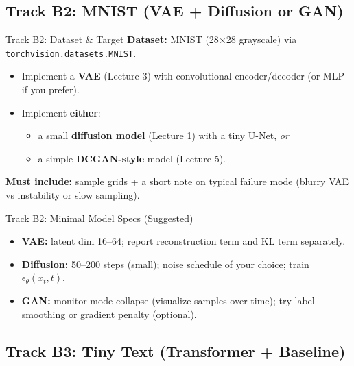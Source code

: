 \documentclass[aspectratio=169]{beamer}
\begin{document}
\subsection{Track B2: MNIST (VAE + Diffusion or GAN)}

\begin{frame}{Track B2: Dataset \& Target}
\small
\textbf{Dataset:} MNIST (28$\times$28 grayscale) via \texttt{torchvision.datasets.MNIST}.
\begin{itemize}
  \item Implement a \textbf{VAE} (Lecture 3) with convolutional encoder/decoder (or MLP if you prefer).
  \item Implement \textbf{either}:
  \begin{itemize}
    \item a small \textbf{diffusion model} (Lecture 1) with a tiny U-Net, \emph{or}
    \item a simple \textbf{DCGAN-style} model (Lecture 5).
  \end{itemize}
\end{itemize}
\vspace{0.4em}
\textbf{Must include:} sample grids + a short note on typical failure mode (blurry VAE vs instability or slow sampling).
\end{frame}

\begin{frame}{Track B2: Minimal Model Specs (Suggested)}
\small
\begin{itemize}
  \item \textbf{VAE:} latent dim 16--64; report reconstruction term and KL term separately.
  \item \textbf{Diffusion:} 50--200 steps (small); noise schedule of your choice; train $\epsilon_\theta(x_t,t)$.
  \item \textbf{GAN:} monitor mode collapse (visualize samples over time); try label smoothing or gradient penalty (optional).
\end{itemize}
\end{frame}

\subsection{Track B3: Tiny Text (Transformer + Baseline)}
\end{document}
